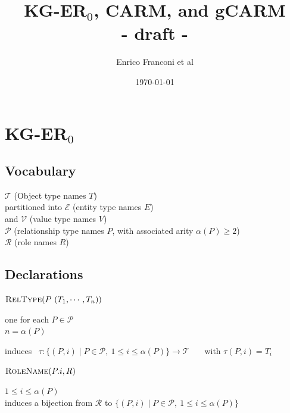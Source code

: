 \documentclass[10pt]{article}
\title{\vspace{-4ex}KG-ER$_0$, \textsf{CARM}, and  \textsf{gCARM}\\ - draft -}
\author{Enrico Franconi et al}
\date{\today}
\begin{document}
\maketitle

\immediate{}




\section{KG-ER$_0$ %
}


\subsection*{Vocabulary}
$\mathcal{T}$ (Object type names $T$) \\
\phantom{}\hspace{1em}
partitioned into $\mathcal{E}$ (entity type names $E$) \\
\phantom{}\hspace{1em}
and $\mathcal{V}$ (value type names $V$)\\
$\mathcal{P}$ (relationship type names $P$, with associated arity $\alpha(P)\geq 2$)\\
$\mathcal{R}$ (role names $R$)

\noindent


\subsection*{Declarations}

\noindent
$\textsc{RelType}(P\ (T_1, \cdots , T_n))$ 
~~~~~{ 
\parbox[t]{\textwidth}{%
one for each $P\in\mathcal{P}$\\
$n=\alpha(P)$\\
\parbox[t]{\textwidth}{%
induces~ 
$\tau:\{(P,i)\mid P\in\mathcal P,\ 1\leq i\leq\alpha(P)\}\to\mathcal T$ ~~~with $\tau(P,i)=T_i$}}}

\noindent
$\textsc{RoleName}(P.i, R)$ 
~~~~~~~~~~~~~~~~~~~~~~~{ 
\parbox[t]{\textwidth}{%
$1\leq i\leq \alpha(P)$\\
induces a bijection from $\mathcal{R}$ to 
$\displaystyle\{(P,i)\mid P\in\mathcal P,\ 1\leq i\leq\alpha(P)\}$
}}
\end{document}
